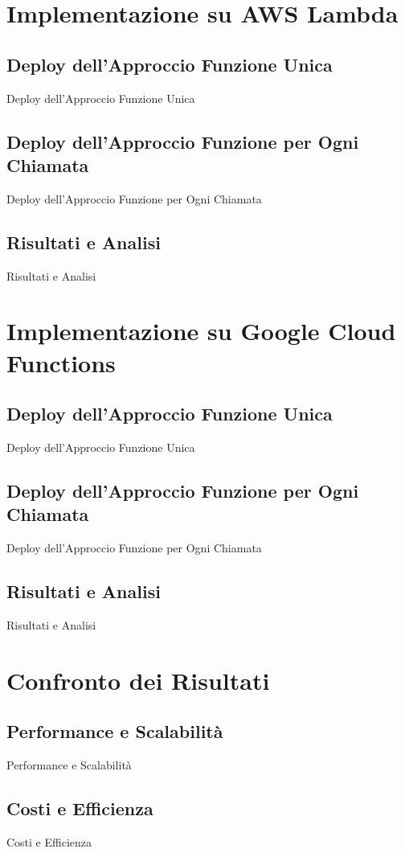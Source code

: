 \documentclass[12pt,a4paper,twoside]{book}
\begin{document}
\section{Implementazione su AWS Lambda}
\subsection{Deploy dell’Approccio Funzione Unica}
Deploy dell’Approccio Funzione Unica

\subsection{Deploy dell’Approccio Funzione per Ogni Chiamata}
Deploy dell’Approccio Funzione per Ogni Chiamata

\subsection{Risultati e Analisi}
Risultati e Analisi

\section{Implementazione su Google Cloud Functions}
\subsection{Deploy dell’Approccio Funzione Unica}
Deploy dell’Approccio Funzione Unica

\subsection{Deploy dell’Approccio Funzione per Ogni Chiamata}
Deploy dell’Approccio Funzione per Ogni Chiamata

\subsection{Risultati e Analisi}
Risultati e Analisi

\section{Confronto dei Risultati}
\subsection{Performance e Scalabilità}
Performance e Scalabilità

\subsection{Costi e Efficienza}
Costi e Efficienza
\end{document}
